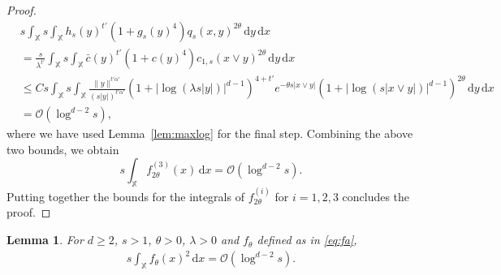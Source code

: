 \documentclass[11pt,reqno]{amsart}
\numberwithin{equation}{section}
\newtheorem{lemma}[theorem]{Lemma}
\theoremstyle{definition}
\newcommand{\XX}{\mathbb{X}}
\newcommand{\diff}{{\,\mathrm d}}
\begin{document}
\begin{proof}
\begin{align}
	&s \int_{\XX} s \int_{\XX} h_s(y)^{t'} (1+g_s(y)^4) q_s(x,y)^{2\theta}
	\diff y \diff x\nonumber\\
	&= \frac{s}{\lambda^{t'}} \int_{\XX}  s \int_{\XX}  \bar c (y)^{t'}  (1+c(y)^4)
	c_{1,s}(x \vee y)^{ 2\theta} \diff y \diff x \nonumber\\
	&\le C s \int_{\XX}  s \int_{\XX} \frac{\|y\|^{t'\alpha'}}{(s|y|)^{t'\alpha'}} \left(1+|\log (\lambda s|y|)|^{d-1}\right)^{4+t'}
	e^{-\theta s |x \vee y|} \left(1+|\log (s|x \vee y|)|^{d-1}\right)^{ 2\theta} \diff y \diff x\nonumber\\
	&=\mathcal{O}(\log^{d-2} s),
	\end{align}
	where we have used Lemma~\ref{lem:maxlog} for the final step. Combining the above two bounds, we obtain 
	\begin{displaymath}
	s \int_{\XX} f_{2\theta}^{(3)}(x) \diff x=\mathcal{O}(\log^{d-2} s).
	\end{displaymath}
	Putting together the bounds for the integrals of $f_{2\theta}^{(i)}$ for $i=1,2,3$ concludes the proof.
\end{proof}



\begin{lemma}\label{lem:intg2s}
	For $d \ge 2$, $s>1$, $\theta>0$, $\lambda>0$ and $f_{\theta}$ defined as in \eqref{eq:fa},
	\begin{align*}
	s \int_{\XX} f_{\theta}(x)^2 \diff x =\mathcal{O}(\log^{d-2} s).
	\end{align*}
\end{lemma}
\end{document}
